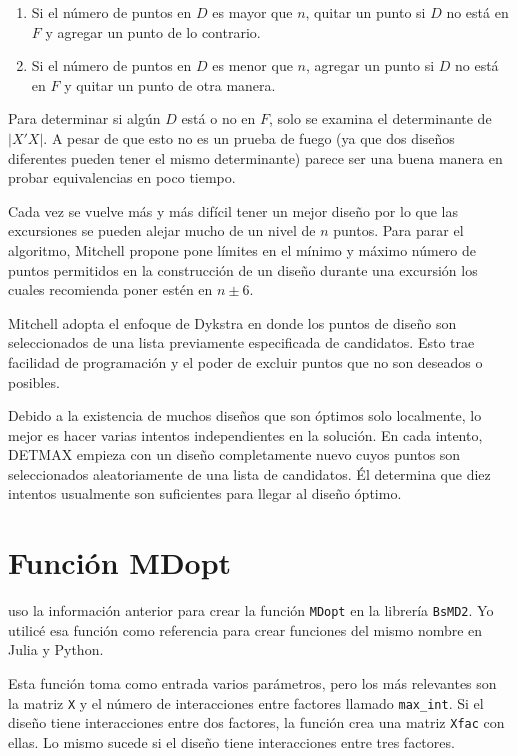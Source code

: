 \begin{enumerate}
	\item Si el número de puntos en $D$ es mayor que $n$, quitar un punto si $D$ no está en $F$ y agregar un punto de lo contrario. 
	
	\item Si el número de puntos en $D$ es menor que $n$, agregar un punto si $D$ no está en $F$ y quitar un punto de otra manera. 
\end{enumerate}

Para determinar si algún $D$ está o no en $F$, solo se examina el determinante de $|X'X|$. A pesar de que esto no es un prueba de fuego (ya que dos diseños diferentes pueden tener el mismo determinante) parece ser una buena manera en probar equivalencias en poco tiempo. 

Cada vez se vuelve más y más difícil tener un mejor diseño por lo que las excursiones se pueden alejar mucho de un nivel de $n$ puntos. Para parar el algoritmo, Mitchell propone pone límites en el mínimo y máximo número de puntos permitidos en la construcción de un diseño durante una excursión los cuales recomienda poner estén en $n \pm 6$. 

Mitchell adopta el enfoque de Dykstra  en donde los puntos de diseño son seleccionados de una lista previamente especificada de candidatos. Esto trae facilidad de programación y el poder de excluir puntos que no son deseados o posibles. 

Debido a la existencia de muchos diseños que son óptimos solo localmente, lo mejor es hacer varias intentos independientes en la solución. En cada intento, DETMAX empieza con un diseño completamente nuevo cuyos puntos son seleccionados aleatoriamente de una lista de candidatos. Él determina que diez intentos usualmente son suficientes para llegar al diseño óptimo. 

\section{Función MDopt}
\cite{tesis_paty} uso la información anterior para crear la función \texttt{MDopt} en la librería \texttt{BsMD2}. Yo utilicé esa función como referencia para crear funciones del mismo nombre en Julia y Python. 

Esta función toma como entrada varios parámetros, pero los más relevantes son la matriz \texttt{X} y el número de interacciones entre factores llamado \texttt{max\_int}. Si el diseño tiene interacciones entre dos factores, la función crea una matriz \texttt{Xfac} con ellas. Lo mismo sucede si el diseño tiene interacciones entre tres factores. 

